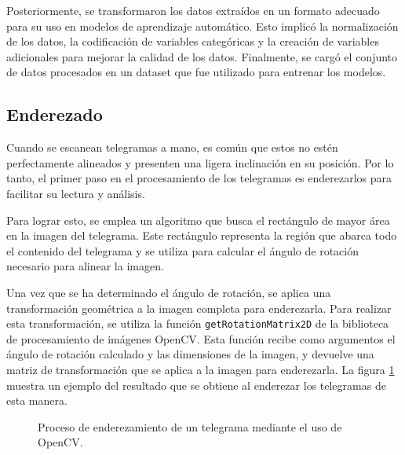 Posteriormente, se transformaron los datos extraídos en un formato adecuado para su uso en modelos de aprendizaje
automático. Esto implicó la normalización de los datos, la codificación de variables categóricas y la creación de
variables adicionales para mejorar la calidad de los datos. Finalmente, se cargó el conjunto de datos procesados en un
dataset que fue utilizado para entrenar los modelos.

\subsection{Enderezado}
Cuando se escanean telegramas a mano, es común que estos no estén perfectamente alineados y presenten una ligera
inclinación en su posición. Por lo tanto, el primer paso en el procesamiento de los telegramas es enderezarlos para
facilitar su lectura y análisis.

Para lograr esto, se emplea un algoritmo que busca el rectángulo de mayor área en la imagen del telegrama. Este
rectángulo representa la región que abarca todo el contenido del telegrama y se utiliza para calcular el ángulo de
rotación necesario para alinear la imagen.

Una vez que se ha determinado el ángulo de rotación, se aplica una transformación geométrica a la imagen completa para
enderezarla. Para realizar esta transformación, se utiliza la función \verb|getRotationMatrix2D| de la biblioteca de
procesamiento de imágenes OpenCV. Esta función recibe como argumentos el ángulo de rotación calculado y las dimensiones
de la imagen, y devuelve una matriz de transformación que se aplica a la imagen para enderezarla. La figura
\ref{fig:etl-1-rotacion} muestra un ejemplo del resultado que se obtiene al enderezar los telegramas de esta manera.

\begin{figure}[H]
    \centering



    \caption[Enderezamiento de un telegrama]{Proceso de enderezamiento de un telegrama mediante el uso de OpenCV.}
    \label{fig:etl-1-rotacion}
\end{figure}

